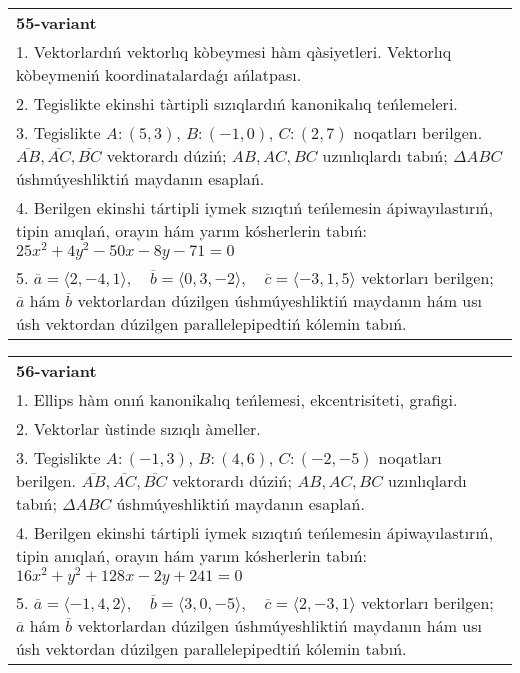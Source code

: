 \documentclass{article}
\begin{document}
\begin{tabular}{m{17cm}}
\textbf{55-variant}\\
1. Vektorlardıń vektorlıq kòbeymesi hàm qàsiyetleri. Vektorlıq kòbeymeniń koordinatalardaǵı ańlatpası. \\

2. Tegislikte ekinshi tàrtipli sızıqlardıń kanonikalıq teńlemeleri.\\

3. Tegislikte $A: (5, 3)$, $B: (-1, 0)$, $C: (2, 7)$ noqatları berilgen. $\overline{AB}, \overline{AC}, \overline{BC}$ vektorardı dúziń; $AB, AC, BC$ uzınlıqlardı tabıń; $\Delta ABC$ úshmúyeshliktiń maydanın esaplań. \\

4. Berilgen ekinshi tártipli iymek sızıqtıń teńlemesin ápiwayılastırıń, tipin anıqlań, orayın hám yarım kósherlerin tabıń: $25x^2+4y^2-50x-8y-71=0$\\

5. \(\overline{a} = \langle 2, -4, 1 \rangle, \quad \overline{b} = \langle 0, 3, -2 \rangle, \quad \overline{c} = \langle -3, 1, 5 \rangle\) vektorları berilgen; \(\overline{a}\) hám \(\overline{b}\) vektorlardan dúzilgen úshmúyeshliktiń maydanın hám usı úsh vektordan dúzilgen parallelepipedtiń kólemin tabıń.
\end{tabular}
\vspace{1cm}


\begin{tabular}{m{17cm}}
\textbf{56-variant}\\
1. Ellips hàm onıń kanonikalıq teńlemesi, ekcentrisiteti, grafigi.\\

2. Vektorlar ùstinde sızıqlı àmeller.\\

3. Tegislikte $A: (-1, 3)$, $B: (4, 6)$, $C: (-2, -5)$ noqatları berilgen. $\overline{AB}, \overline{AC}, \overline{BC}$ vektorardı dúziń; $AB, AC, BC$ uzınlıqlardı tabıń; $\Delta ABC$ úshmúyeshliktiń maydanın esaplań. \\

4. Berilgen ekinshi tártipli iymek sızıqtıń teńlemesin ápiwayılastırıń, tipin anıqlań, orayın hám yarım kósherlerin tabıń: $16x^2+y^2+128x-2y+241=0$\\

5. \(\overline{a} = \langle -1, 4, 2 \rangle, \quad \overline{b} = \langle 3, 0, -5 \rangle, \quad \overline{c} = \langle 2, -3, 1 \rangle\) vektorları berilgen; \(\overline{a}\) hám \(\overline{b}\) vektorlardan dúzilgen úshmúyeshliktiń maydanın hám usı úsh vektordan dúzilgen parallelepipedtiń kólemin tabıń.
\end{tabular}
\vspace{1cm}
\end{document}
